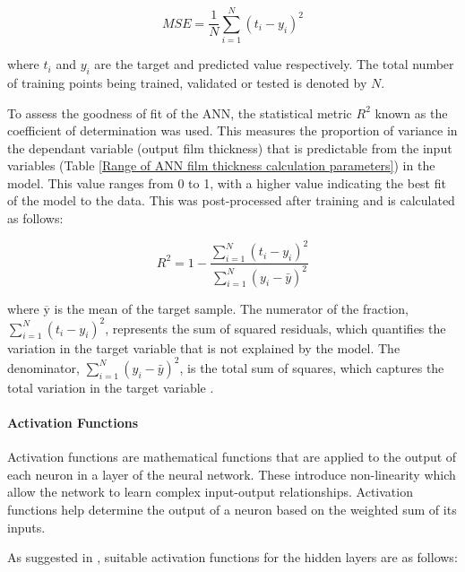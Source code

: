 \begin{equation}\label{MSE}
	M S E=\frac{1}{N} \sum_{i=1}^N\left(t_i-y_i\right)^2
\end{equation}

where $t_i$ and $y_i$ are the target and predicted value respectively. The total number of training points being trained, validated or tested is denoted by $N$. 

To assess the goodness of fit of the ANN, the statistical metric $R^2$ known as the coefficient of determination was used. This measures the proportion of variance in the dependant variable (output film thickness) that is predictable from the input variables (Table \ref{Range of ANN film thickness calculation parameters}) in the model. This value ranges from 0 to 1, with a higher value indicating the best fit of the model to the data. This was post-processed after training and is calculated as follows:

\begin{equation}\label{R-squared}
	R^2=1-\frac{\sum_{i=1}^N\left(t_i-y_i\right)^2}{\sum_{i=1}^N\left(y_i-\bar{y}\right)^2}
\end{equation}

 where $\overline{\mathrm{y}}$ is the mean of the target sample. The numerator of the fraction, \( \sum_{i=1}^N(t_i - y_i)^2 \), represents the sum of squared residuals, which quantifies the variation in the target variable that is not explained by the model. The denominator, \( \sum_{i=1}^N(y_i - \bar{y})^2 \), is the total sum of squares, which captures the total variation in the target variable \cite{Marian2022}.

\paragraph{Activation Functions}

Activation functions are mathematical functions that are applied to the output of each neuron in a layer of the neural network. These introduce non-linearity which allow the network to learn complex input-output relationships. Activation functions help determine the  output of a neuron based on the weighted sum of its inputs.

As suggested in \cite{Marian2022}, suitable activation functions for the hidden layers are as follows:

